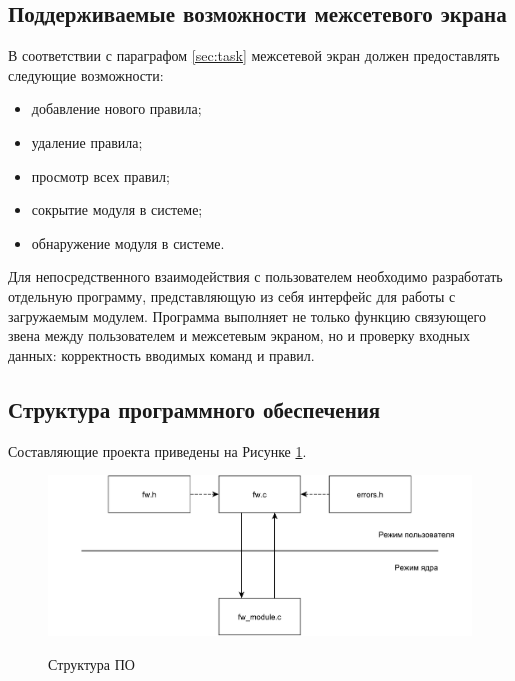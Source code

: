 \newpage

\subsection{Поддерживаемые возможности межсетевого экрана}
В соответствии с параграфом \ref{sec:task} межсетевой экран должен предоставлять следующие возможности:
\begin{itemize}
	\item добавление нового правила;

	\item удаление правила;
	
	\item просмотр всех правил;
	
	\item сокрытие модуля в системе;
	
	\item обнаружение модуля в системе. \\
\end{itemize}

Для непосредственного взаимодействия с пользователем необходимо разработать отдельную программу, представляющую из себя интерфейс для работы с загружаемым модулем. Программа выполняет не только функцию связующего звена между пользователем и межсетевым экраном, но и проверку входных данных: корректность вводимых команд и правил. \newline

\subsection{Структура программного обеспечения}
Составляющие проекта приведены на Рисунке \ref{fig30:image}.
\begin{figure}[h!]
	\begin{center}
		{\includegraphics[scale = 0.63]{img/struct.pdf}}
		\caption{Структура ПО}
		\label{fig30:image}
	\end{center}
\end{figure}

